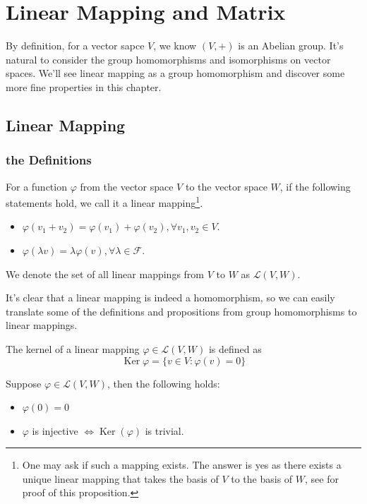 \chapter{Linear Mapping and Matrix}
By definition, for a vector sapce $V$, we know $(V,+)$ is an Abelian group. It's natural to consider the group homomorphisms and isomorphisms on vector spaces.
We'll see linear mapping as a group homomorphism and discover some more fine properties in this chapter.

\section{Linear Mapping}
\subsection{the Definitions}
\begin{definition}
    For a function $\varphi$ from the vector space $V$ to the vector space $W$, if the following statements hold, we call it a linear mapping\footnote{One may ask if such a mapping exists. 
    The answer is yes as there exists a unique linear mapping that takes the basis of $V$ to the basis of $W$, see \cite[p.~54]{Axler_2024} for proof of this proposition.}.
    \begin{itemize}
        \item $\varphi(v_1+v_2) = \varphi(v_1) +\varphi(v_2),\forall v_1,v_2 \in V.$
        \item $\varphi(\lambda v) =\lambda \varphi(v),\forall \lambda \in \mathcal{F}.$
    \end{itemize}
    We denote the set of all linear mappings from $V$ to $W$ as $\mathcal{L}(V,W)$.
\end{definition}

It's clear that a linear mapping is indeed a homomorphism, so we can easily translate some of the definitions and propositions from group homomorphisms to linear mappings.
\begin{definition}[Kernel]
    The kernel of a linear mapping $\varphi \in \mathcal{L}(V,W)$ is defined as $$\operatorname{Ker} \varphi = \{v \in V : \varphi(v) = 0\}$$
\end{definition}

\begin{proposition}
    Suppose $\varphi \in \mathcal{L}(V,W)$, then the following holds:
    \begin{itemize}
        \item $\varphi(0) = 0$
        \item $\varphi$ is injective $\iff \operatorname{Ker} (\varphi)$ is trivial. 
    \end{itemize}
\end{proposition}


